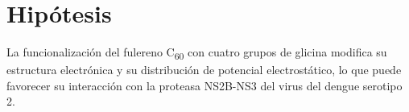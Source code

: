\titleformat{\chapter}[display]
  {\normalfont\bfseries}{}{0pt}{\Large} %
\chapter{Hipótesis}
La funcionalización del fulereno C\textsubscript{60} con cuatro grupos de glicina modifica su estructura electrónica y su distribución de potencial electrostático, lo que puede favorecer su interacción con la proteasa NS2B-NS3 del virus del dengue serotipo 2.
